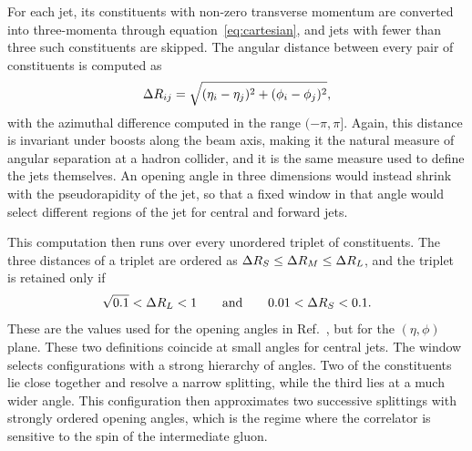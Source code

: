 For each jet, its constituents with non-zero transverse momentum are converted
into three-momenta through equation~\eqref{eq:cartesian}, and jets with fewer than three
such constituents are skipped. The angular distance between every pair of
constituents is computed as
%
\begin{equation}
  \Delta R_{ij} = \sqrt{(\eta_i - \eta_j)^2 + (\phi_i - \phi_j)^2},
  \label{eq:eeec-dr}
\end{equation}
%
with the azimuthal difference computed in the range $(-\pi,\pi]$. Again, this
distance is invariant under boosts along the beam axis, making it the natural
measure of angular separation at a hadron collider, and it is the same measure used
to define the jets themselves. An opening angle in three dimensions would instead
shrink with the pseudorapidity of the jet, so that a fixed window in that angle
would select different regions of the jet for central and forward jets.

This computation then runs over every unordered triplet of constituents. The three
distances of a triplet are ordered as $\Delta R_S \leq \Delta R_M \leq \Delta R_L$, and the
triplet is retained only if
%
\begin{equation}
  \sqrt{0.1} < \Delta R_L < 1
  \qquad\text{and}\qquad
  0.01 < \Delta R_S < 0.1 .
  \label{eq:eeec-window}
\end{equation}
%
These are the values used for the opening angles in Ref.~\cite{Karlberg_2021},
but for the $(\eta,\phi)$ plane. These two definitions coincide at small angles for
central jets. The window selects configurations with a strong hierarchy of angles.
Two of the constituents lie close together and resolve a narrow splitting, while
the third lies at a much wider angle. This configuration then approximates two
successive splittings with strongly ordered opening angles, which is the regime
where the correlator is sensitive to the spin of the intermediate gluon.

